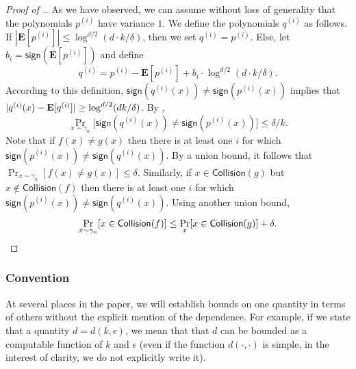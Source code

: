 \documentclass{toc}
\newcommand{\E}{{\bf E}}
\begin{document}
\begin{proof}[Proof of .]
As we have observed, we can assume without loss of generality that the polynomials $p^{(i)}$ have variance $1$. We define the polynomials $q^{(i)}$ as follows. If $|\mathbf{E}[p^{(i)}] | \leq \log^{d/2}(d \cdot k / \delta)$, then we set $q^{(i)} = p^{(i)}$. Else, let $b_i  = \mathsf{sign} (\mathbf{E}[p^{(i)}])$ and define 
\[
q^{(i)} = p^{(i)}  -\mathbf{E}[p^{(i)}]  + b_i \cdot \log^{d/2}(d \cdot k / \delta). 
\]
%
%
According to this definition, $\mathsf{sign}(q^{(i)}(x)) \ne \mathsf{sign}(p^{(i)}(x))$ implies
that $|q^{(i)}(x) - \E[q^{(i)}]| \ge \log^{d/2} (d k/\delta)$.
By ,
\[
\Pr_{x \sim \gamma_n} \big[ \mathsf{sign}(q^{(i)}(x)) \neq  \mathsf{sign}(p^{(i)}(x)) \big] \le \delta/k. 
\]
Note that if $f(x) \ne g(x)$ then there is at least one $i$ for which $\mathsf{sign}(p^{(i)}(x)) \ne \mathsf{sign}(q^{(i)}(x))$.
By a union bound, it follows that $\Pr_{x \sim \gamma_n}[f(x) \ne g(x)] \le \delta$. Similarly, if $x \in \mathsf{Collision}(g)$ but
$x \not \in \mathsf{Collision}(f)$ then there is at least one $i$ for which $\mathsf{sign}(p^{(i)}(x)) \ne \mathsf{sign}(q^{(i)}(x))$.
Using another union bound,
\[
  \Pr_{x \sim \gamma_n} [ x \in \mathsf{Collision}(f) ] \le \Pr_{x}[x \in \mathsf{Collision}(g)] + \delta. \qedhere
  \]
\end{proof}

\subsubsection*{Convention} 
%
At  several places in the paper, we will establish bounds on one quantity in terms of others without the explicit mention of the dependence. For example, if we state that a quantity $d= d(k,\epsilon)$, we mean that that $d$ can be bounded as a computable function of $k$ and $\epsilon$ (even if the function $d(\cdot, \cdot)$ is simple, in the interest of clarity, we do not explicitly write it).  

%
\end{document}
